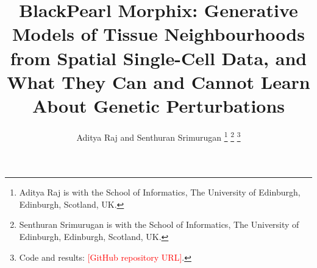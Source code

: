 \documentclass[journal]{IEEEtran}
\newcommand{\todo}[1]{\textcolor{red}{[#1]}}
\begin{document}
\title{BlackPearl Morphix: Generative Models of Tissue Neighbourhoods from Spatial Single-Cell Data, and What They Can and Cannot Learn About Genetic Perturbations}

\author{Aditya Raj and Senthuran Srimurugan%
\thanks{Aditya Raj is with the School of Informatics, The University of Edinburgh, Edinburgh, Scotland, UK.}%
\thanks{Senthuran Srimurugan is with the School of Informatics, The University of Edinburgh, Edinburgh, Scotland, UK.}%
\thanks{Code and results: \todo{GitHub repository URL}.}}

\maketitle

\begin{abstract}

\end{abstract}
\end{document}
